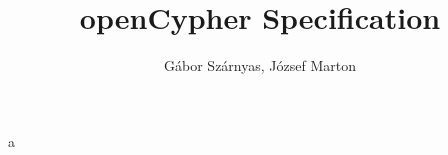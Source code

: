 \documentclass[a4paper]{report}
\title{openCypher Specification}
\author{Gábor Szárnyas, József Marton}
\begin{document}
a
\end{document}
